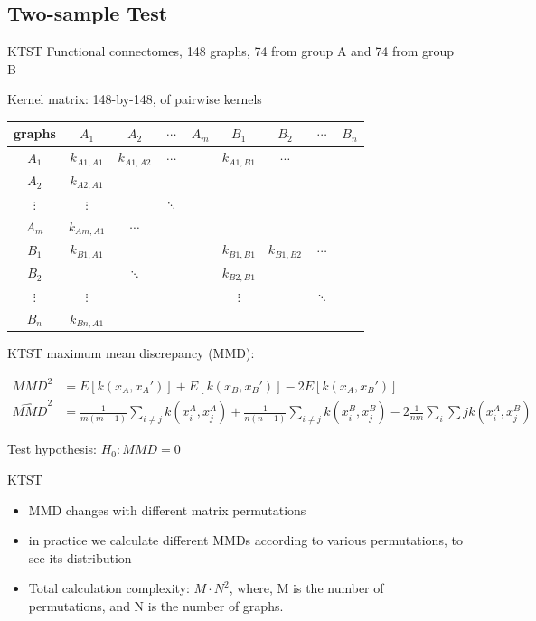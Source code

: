 \documentclass[bigger]{beamer}
\begin{document}
\subsection{Two-sample Test}
\begin{frame}[label=sec-5-1-2]{KTST}
	\label{sec-5-1-2}
Functional connectomes, 148 graphs, 74 from group A and 74 from group B

Kernel matrix: 148-by-148, of pairwise kernels
\begin{center}
	\begin{tabular}{c|c c c c c c c c}
		graphs & $A_1$ & $A_2$ & $\cdots$ & $A_m$& $B_1$ & $B_2$ & $\cdots$ & $B_n$ \\
		\hline
		$A_1$ & $k_{A1,A1}$ & $k_{A1,A2}$ & $\cdots$ & & $k_{A1,B1}$ & $\cdots$ & &\\
		$A_2$ & $k_{A2,A1}$& & & & & & &\\
		$\vdots$ &$\vdots$ & &$\ddots$ & & & & &\\
		$A_m$ & $k_{Am,A1}$ & $\cdots$ & & & & & &\\
		$B_1$ & $k_{B1,A1}$ & &  & &$k_{B1,B1}$ & $k_{B1,B2}$ &$\cdots$ &\\
		$B_2$ & & $\ddots$ & & & $k_{B2,B1}$ & & &\\
		$\vdots$ & $\vdots$ & & & & $\vdots$&  &$\ddots$ &\\
		$B_n$ & $k_{Bn,A1}$ & & & & & & &\\		
	\end{tabular}	
\end{center}
\end{frame}

\begin{frame}[label=sec-5-1-2]{KTST}
	maximum mean discrepancy (MMD):
	
	\begin{align*}
	MMD^2&=E[k(x_A,x_A')]+E[k(x_B,x_B')]-2E[k(x_A,x_B')]\\
	\widehat{MMD}^2&= \frac{1}{m(m-1)}\sum_{i \neq j} k(x_i^A,x_j^A)+\frac{1}{n(n-1)}\sum_{i \neq j} k(x_i^B,x_j^B)-2\frac{1}{nm}\sum_{i}\sum{j} k(x_i^A,x_j^B)
	\end{align*}
	
	Test hypothesis:
	$H_0: MMD=0$
\end{frame}	
	
\begin{frame}[label=sec-5-1-2]{KTST}
\begin{itemize}
	\item MMD changes with different matrix permutations
	\item in practice we calculate different MMDs according to various permutations, to see its distribution
	\item Total calculation complexity: $M\cdot N^2$, where, M is the number of permutations, and N is the number of graphs.
\end{itemize}
\end{frame}	
\end{document}
